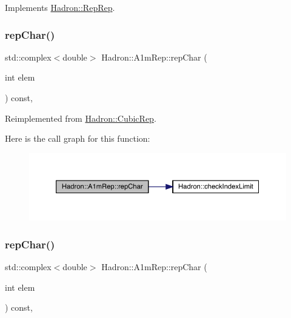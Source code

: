 Implements \mbox{\hyperlink{structHadron_1_1RepRep_ab3213025f6de249f7095892109575fde}{Hadron\+::\+Rep\+Rep}}.

\mbox{\label{structHadron_1_1A1mRep_aae7d6e39a56f0cfd67cb66ad8e1f2f56}} 
\subsubsection{\texorpdfstring{repChar()}{repChar()}\hspace{0.1cm}{\footnotesize\ttfamily [1/2]}}
{\footnotesize\ttfamily std\+::complex$<$double$>$ Hadron\+::\+A1m\+Rep\+::rep\+Char (\begin{DoxyParamCaption}\item[{int}]{elem }\end{DoxyParamCaption}) const\hspace{0.3cm}{\ttfamily [inline]}, {\ttfamily [virtual]}}



Reimplemented from \mbox{\hyperlink{structHadron_1_1CubicRep_af45227106e8e715e84b0af69cd3b36f8}{Hadron\+::\+Cubic\+Rep}}.

Here is the call graph for this function\+:
\nopagebreak
\begin{figure}[H]
\begin{center}
\leavevmode
\includegraphics[width=350pt]{d3/dab/structHadron_1_1A1mRep_aae7d6e39a56f0cfd67cb66ad8e1f2f56_cgraph}
\end{center}
\end{figure}
\mbox{\label{structHadron_1_1A1mRep_aae7d6e39a56f0cfd67cb66ad8e1f2f56}} 
\subsubsection{\texorpdfstring{repChar()}{repChar()}\hspace{0.1cm}{\footnotesize\ttfamily [2/2]}}
{\footnotesize\ttfamily std\+::complex$<$double$>$ Hadron\+::\+A1m\+Rep\+::rep\+Char (\begin{DoxyParamCaption}\item[{int}]{elem }\end{DoxyParamCaption}) const\hspace{0.3cm}{\ttfamily [inline]}, {\ttfamily [virtual]}}



